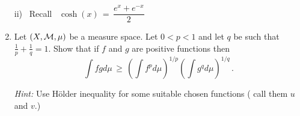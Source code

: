 \documentclass[12pt]{article}
\begin{document}
\begin{enumerate}
\qquad \qquad ii) \, Recall \,  $\cosh(x)\, = \,  \dfrac{ e^{x} + e^{-x}}{2} $  


\newpage 

\item
\vspace{.2in}
Let $(X, {\cal M}, \mu)$ be a measure space. Let $0 < p <1 $ and let $q$ be such that $\frac{1}{p} + \frac{1}{q} =1$.  Show that if $f$ and $g$  are positive functions then 
\[
\int f g d\mu  \,\ge \,  \left( \int  f^p d\mu\right)^{1/p} \left( \int  g^q d\mu\right)^{1/q}  \,.
\]

{\it Hint:} Use H\"older inequality for some suitable chosen functions ( call them $u$ and $v$.) 









\end{enumerate} 
\end{document}
